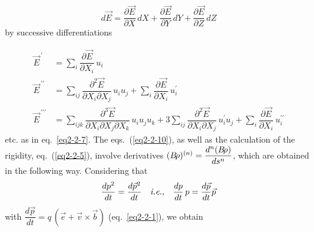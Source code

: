  \begin{equation}
	 d\vec  E = \dfrac{\partial\vec  E}{\partial X}\, dX + 
	 \dfrac{\partial\vec  E }{\partial Y} \, dY + 
	 \dfrac{\partial\vec  E }{ \partial Z} \, dZ
 	\label{eq2-2-11}
 \end{equation} 
%
 by successive differentiations

\begin{equation}
	\begin{aligned}
		\vec  E^{\,\prime} 
		     & =   \sum_ i \dfrac{\partial\vec  E}{\partial X_i} \,u_i \\
		\vec  E^{\,\prime\prime} 
		     & =  \sum_{ij} \dfrac{\partial^ 2\vec  E}{\partial X_i\partial X_j}\, u_i u_j 
		       +\sum_i \dfrac{\partial\vec  E}{\partial X_i} \,u^{\prime}_i \\
		\vec  E^{\,\prime\prime\prime} 
		     & =  \sum_{ijk} \dfrac{\partial^ 3\vec  E }{\partial X_i\partial X_j\partial X_k}\,
		        u_i u_j u_k 
		        + 3 \sum_{ij} \dfrac{\partial^ 2\vec  E}{\partial X_i\partial X_j} \,u^{\prime}_i u_j 
		        + \sum_i \dfrac{\partial\vec  E}{\partial X_i} \,u^{\prime\prime}_i 
	\end{aligned}
	\label{eq2-2-12}
\end{equation}
%
\noindent etc. as in eq.~\ref{eq2-2-7}. 
The eqs.~(\ref{eq2-2-10}), as well as the calculation of the rigidity, eq.~(\ref{eq2-2-5}), involve 
derivatives $ (B\!\rho)^{(n)} =  \dfrac{ d^n(B\!\rho )}{ds^n} $, which are obtained in the following way. 
Considering that 
%
\begin{equation}
	\dfrac{dp^2 }{dt} = \dfrac{d\vec  p^{2} }{ dt}
	\quad \text{\emph{i.e.},} \quad 
	\dfrac{dp}{dt}\, p = \dfrac{d\vec  p}{dt} \vec  p
	\label{eq2-2-13}
\end{equation}
%
with $ \dfrac{ d\vec  p }{ dt} = q\,(\vec  e +\vec v\times\vec  b) $ 
(eq.~\ref{eq2-2-1}), we obtain


